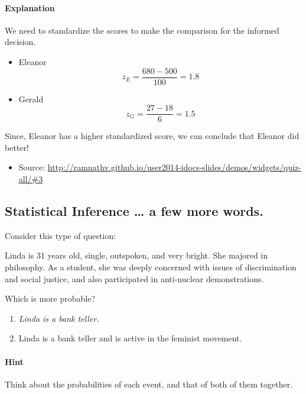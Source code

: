 \documentclass[]{article}
\begin{document}
\paragraph{Explanation}\label{explanation}

We need to standardize the scores to make the comparison for the
informed decision.

\begin{itemize}
\itemsep1pt\parskip0pt
\item
  Eleanor \[z_E = \frac{680 - 500}{100} = 1.8\]
\item
  Gerald \[z_G = \frac{27 - 18}{6} = 1.5\]
\end{itemize}

Since, Eleanor has a higher standardized score, we can conclude that
Eleanor did better!

\begin{itemize}
\itemsep1pt\parskip0pt
\item
  Source:
  \url{http://ramnathv.github.io/user2014-idocs-slides/demos/widgets/quiz-all/\#3}
\end{itemize}

\subsection{Statistical Inference \ldots{} a few more
words.}\label{statistical-inference-a-few-more-words.}

Consider this type of question:

Linda is 31 years old, single, outspoken, and very bright. She majored
in philosophy. As a student, she was deeply concerned with issues of
discrimination and social justice, and also participated in anti-nuclear
demonstrations.

Which is more probable?

\begin{enumerate}
\def\labelenumi{\arabic{enumi}.}
\itemsep1pt\parskip0pt
\item
  \emph{Linda is a bank teller.}
\item
  Linda is a bank teller and is active in the feminist movement.
\end{enumerate}

\paragraph{Hint}\label{hint}

Think about the probabilities of each event, and that of both of them
together.
\end{document}

